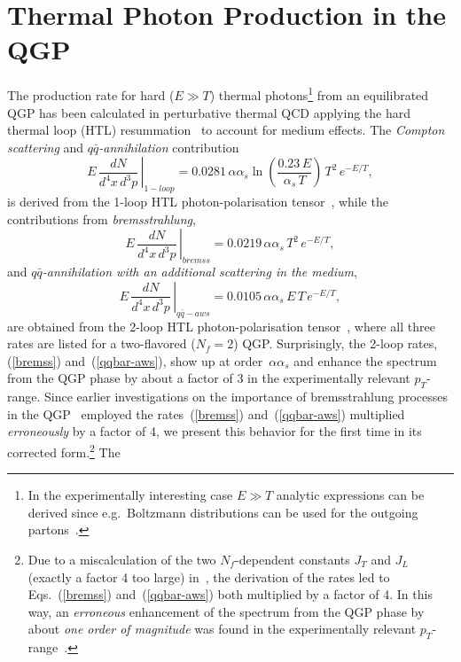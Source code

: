 \documentclass[12pt,twoside,fleqn]{article}
\newcommand{\be}{\begin{equation}}
\newcommand{\ee}{\end{equation}}
\begin{document}
\section{Thermal Photon Production in the QGP}
\label{Thermal_Photon_Production_QGP}
%
The production rate for hard ($E \gg T$) thermal photons\footnote{In the
  experimentally interesting case $E\gg T$ analytic expressions can be derived
  since e.g.\ Boltzmann distributions can be used for the outgoing
  partons~\cite{KAPUSTA_1991}.} from an equilibrated QGP has been calculated in
perturbative thermal QCD applying the hard thermal loop (HTL)
resummation~\cite{BRAATEN_1990} to account for medium effects. The {\em Compton
  scattering} and {\em $q\bar{q}$-annihilation} contribution
%
\be
        \left. E\,\frac{dN}{d^4x\,d^3p} \,\right|_{1-loop} = 
        0.0281\,\alpha \alpha_s \ln \left(\frac{0.23\,E}{\alpha_s\,T}\right)
        \,T^2\,e^{-E/T},
\label{1-loop}
\ee
%
is derived from the 1-loop HTL photon-polarisation
tensor~\cite{KAPUSTA_1991,BAIER_1991,TRAXLER_1995}, while the contributions from
{\em bremsstrahlung},
%
\be
        \left. E\,\frac{dN}{d^4x\,d^3p} \,\right|_{bremss} = 
        0.0219\,\alpha \alpha_s
        \,T^2\,e^{-E/T},
\label{bremss}
\ee
%
and {\em $q\bar{q}$-annihilation with an additional scattering in the medium},
%
\be
        \left. E\,\frac{dN}{d^4x\,d^3p} \,\right|_{q\bar{q}-aws} =  
        0.0105\,\alpha \alpha_s
        \,E\,T\,e^{-E/T},
\label{qqbar-aws}
\ee
%
are obtained from the 2-loop HTL photon-polarisation
tensor~\cite{AURENCHE_1998}, where all three rates are listed for a two-flavored
($N_f = 2$) QGP.  Surprisingly, the 2-loop rates, (\ref{bremss})
and~(\ref{qqbar-aws}), show up at order~$\alpha\alpha_s$ and enhance the
spectrum from the QGP phase by about a factor of 3 in the experimentally
relevant $p_T$-range. Since earlier investigations on the importance of
bremsstrahlung processes in the
QGP~\cite{SRIVASTAVA_1999,SRIVASTAVA_SINHA_1999,STEFFEN_1999} employed the
rates~(\ref{bremss}) and~(\ref{qqbar-aws}) multiplied {\em erroneously} by a
factor of 4, we present this behavior for the first time in its corrected
form.\footnote{Due to a miscalculation of the two $N_f$-dependent constants
  $J_T$ and $J_L$ (exactly a factor 4 too large)
  in~\cite{AURENCHE_1998,SRIVASTAVA_1999}, the derivation of the rates led to
  Eqs.~(\ref{bremss}) and~(\ref{qqbar-aws}) both multiplied by a factor of 4. In
  this way, an {\em erroneous} enhancement of the spectrum from the QGP phase by
  about {\em one order of magnitude} was found in the experimentally relevant
  $p_T$-range~\cite{SRIVASTAVA_1999,SRIVASTAVA_SINHA_1999,STEFFEN_1999}.}  The
\end{document}
